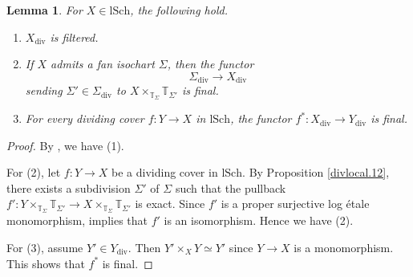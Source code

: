 \documentclass[10pt]{amsart}
\newtheorem{lem}[thm]{Lemma}
\theoremstyle{definition}
\theoremstyle{remark}
\numberwithin{equation}{subsection}
\newcommand{\T}{\mathbb{T}}
\newcommand{\lSch}{\mathrm{lSch}}
\newcommand{\divi}{\mathrm{div}}
\begin{document}
\begin{lem}
\label{divlocal.10}
For $X\in \lSch$,
the following hold.
\begin{enumerate}
\item[\textup{(1)}]
$X_{\divi}$ is filtered.
\item[\textup{(2)}]
If $X$ admits a fan isochart $\Sigma$, then the functor
\[
\Sigma_{\divi}\to X_{\divi}
\]
sending $\Sigma'\in \Sigma_{\divi}$ to $X\times_{\T_\Sigma}\T_{\Sigma'}$ is final.
\item[\textup{(3)}]
For every dividing cover $f\colon Y\to X$ in $\lSch$, the functor $f^*\colon X_{\divi}\to Y_{\divi}$ is final.
\end{enumerate}
\end{lem}
\begin{proof}
By \cite[Proposition A.11.14]{logDM}, we have (1).

For (2),
let $f\colon Y\to X$ be a dividing cover in $\lSch$.
By Proposition \ref{divlocal.12},
there exists a subdivision $\Sigma'$ of $\Sigma$ such that the pullback $f'\colon Y\times_{\T_\Sigma}\T_{\Sigma'}\to X\times_{\T_\Sigma}\T_{\Sigma'}$ is exact.
Since $f'$ is a proper surjective log \'etale monomorphism,
\cite[Proposition A.11.13]{logDM} implies that $f'$ is an isomorphism.
Hence we have (2).

For (3), assume $Y'\in Y_{\divi}$.
Then $Y'\times_X Y\simeq Y'$ since $Y\to X$ is a monomorphism.
This shows that $f^*$ is final.
\end{proof}
\end{document}
